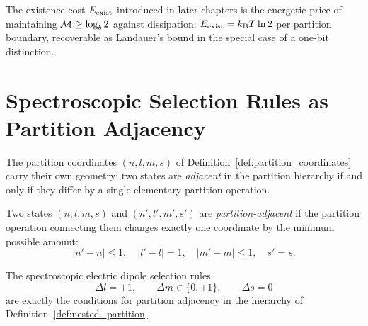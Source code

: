 The existence cost $E_{\mathrm{exist}}$ introduced in later chapters is the energetic
price of maintaining $\mathcal{M} \geq \log_b 2$ against dissipation:
$E_{\mathrm{exist}} = k_{\mathrm{B}} T \ln 2$ per partition boundary, recoverable as Landauer's bound
in the special case of a one-bit distinction.

\section{Spectroscopic Selection Rules as Partition Adjacency}
\label{sec:selection_rules}

The partition coordinates $(n, l, m, s)$ of Definition~\ref{def:partition_coordinates}
carry their own geometry: two states are \emph{adjacent} in the partition
hierarchy if and only if they differ by a single elementary partition operation.

\begin{definition}
\label{def:partition_adjacency}
Two states $(n, l, m, s)$ and $(n', l', m', s')$ are \emph{partition-adjacent}
if the partition operation connecting them changes exactly one coordinate by
the minimum possible amount:
\begin{equation}
  |n' - n| \leq 1, \quad |l' - l| = 1, \quad |m' - m| \leq 1, \quad s' = s.
\end{equation}
\end{definition}

\begin{theorem}
\label{thm:selection_rules}
The spectroscopic electric dipole selection rules
\begin{equation}
  \Delta l = \pm 1, \qquad \Delta m \in \{0, \pm 1\}, \qquad \Delta s = 0
  \label{eq:selection_rules}
\end{equation}
are exactly the conditions for partition adjacency in the hierarchy of
Definition~\ref{def:nested_partition}.
\end{theorem}

